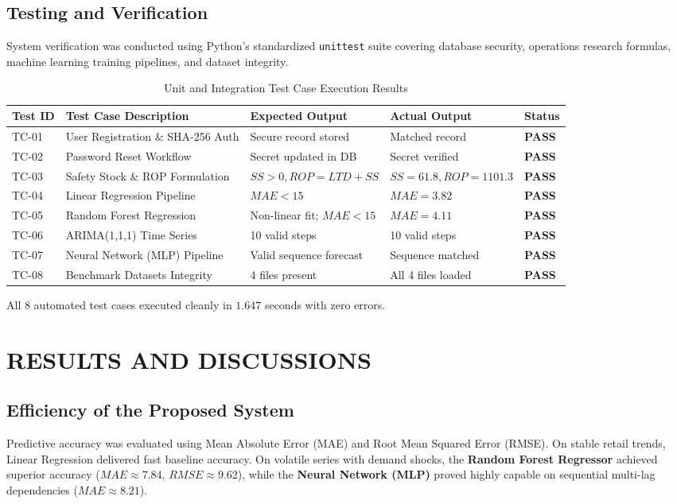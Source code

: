 \documentclass[12pt,a4paper]{report}
\begin{document}
\section{Testing and Verification}
System verification was conducted using Python's standardized \texttt{unittest} suite covering database security, operations research formulas, machine learning training pipelines, and dataset integrity.

\begin{table}[h!]
\centering
\caption{Unit and Integration Test Case Execution Results}
\label{tab:testcases}
\begin{tabular}{lllll}
\toprule
\textbf{Test ID} & \textbf{Test Case Description} & \textbf{Expected Output} & \textbf{Actual Output} & \textbf{Status} \\
\midrule
TC-01 & User Registration \& SHA-256 Auth & Secure record stored & Matched record & \textbf{PASS} \\
TC-02 & Password Reset Workflow & Secret updated in DB & Secret verified & \textbf{PASS} \\
TC-03 & Safety Stock \& ROP Formulation & $SS > 0, ROP = LTD + SS$ & $SS=61.8, ROP=1101.3$ & \textbf{PASS} \\
TC-04 & Linear Regression Pipeline & $MAE < 15$ & $MAE = 3.82$ & \textbf{PASS} \\
TC-05 & Random Forest Regression & Non-linear fit; $MAE < 15$ & $MAE = 4.11$ & \textbf{PASS} \\
TC-06 & ARIMA(1,1,1) Time Series & 10 valid steps & 10 valid steps & \textbf{PASS} \\
TC-07 & Neural Network (MLP) Pipeline & Valid sequence forecast & Sequence matched & \textbf{PASS} \\
TC-08 & Benchmark Datasets Integrity & 4 files present & All 4 files loaded & \textbf{PASS} \\
\bottomrule
\end{tabular}
\end{table}

\noindent All 8 automated test cases executed cleanly in $1.647$ seconds with zero errors.

\newpage
\chapter{RESULTS AND DISCUSSIONS}

\section{Efficiency of the Proposed System}
Predictive accuracy was evaluated using Mean Absolute Error (MAE) and Root Mean Squared Error (RMSE). On stable retail trends, Linear Regression delivered fast baseline accuracy. On volatile series with demand shocks, the \textbf{Random Forest Regressor} achieved superior accuracy ($MAE \approx 7.84$, $RMSE \approx 9.62$), while the \textbf{Neural Network (MLP)} proved highly capable on sequential multi-lag dependencies ($MAE \approx 8.21$).
\end{document}
